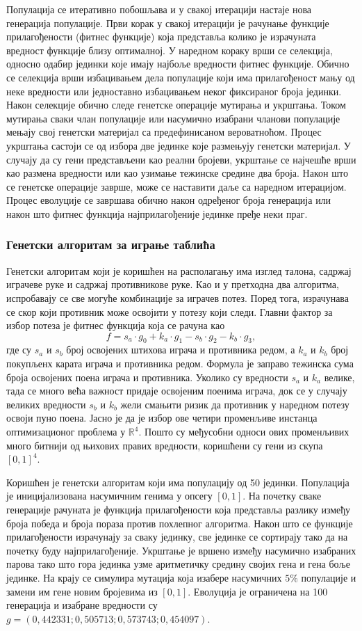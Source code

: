 \documentclass[a4paper, 12pt, ngerman]{article}
\begin{document}
Популација се итеративно побошљава и у свакој итерацији настаје нова генерација популације. Први корак у свакој итерацији је рачунање функције прилагођености (фитнес функције) која представља колико је израчуната вредност функције близу оптималној. У наредном кораку врши се селекција, односно одабир јединки које имају најбоље вредности фитнес функције. Обично се селекција врши избацивањем дела популације који има прилагођеност мању од неке вредности или једноставно избацивањем неког фиксираног броја јединки.  Након селекције обично следе генетске операције мутирања и укрштања. Током мутирања сваки члан популације или насумично изабрани чланови популације мењају свој генетски материјал са предефинисаном вероватноћом. Процес укрштања састоји се од избора две јединке које размењују генетски материјал. У случају да су гени представљени као реални бројеви, укрштање се најчешће врши као размена вредности или као узимање тежинске средине два броја. Након што се генетске операције заврше, може се наставити даље са наредном итерацијом. Процес еволуције се завршава обично након одређеног броја генерација или након што фитнес функција најприлагођеније јединке пређе неки праг.

\subsubsection{Генетски алгоритам за играње таблића}
Генетски алгоритам који је коришћен на располагању има изглед талона, садржај играчеве руке и садржај противникове руке. Као и у претходна два алгоритма, испробавају се све могуће комбинације за играчев потез. Поред тога, израчунава се скор који противник може освојити у потезу који следи. Главни фактор за избор потеза је фитнес функција која се рачуна као
$$f = s_a \cdot g_0 + k_a \cdot g_1 - s_b \cdot g_2 - k_b \cdot g_3,$$
где су $s_a$ и $s_b$ број освојених штихова играча и противника редом, а $k_a$ и $k_b$ број покупљенх карата играча и противника редом. Формула је заправо тежинска сума броја освојених поена играча и противника. Уколико су вредности $s_a$ и $k_a$ велике, тада се много већа важност придаје освојеним поенима играча, док се у случају великих вредности $s_b$ и $k_b$ жели смањити ризик да противник у наредном потезу освоји пуно поена. Јасно је да је избор ове четири променљиве инстанца оптимизационог проблема у $\mathbb{R}^4$. Пошто су међусобни односи ових променљивих много битнији од њихових правих вредности, коришћени су гени из скупа $[0, 1]^4$.

Коришћен је генетски алгоритам који има популацију од 50 јединки. Популација је иницијализована насумичним генима у опсегу $[0, 1]$. На почетку сваке генерације рачуната је функција прилагођености која представља разлику између броја победа и броја пораза против похлепног алгоритма. Након што се функције прилагођености израчунају за сваку јединку, све јединке се сортирају тако да на почетку буду најприлагођеније. Укрштање је вршено између насумично изабраних парова тако што гора јединка узме аритметичку средину својих гена и гена боље јединке. На крају се симулира мутација која изабере насумичних $5\%$ популације и замени им гене новим бројевима из $[0, 1]$. Еволуција је ограничена на 100 генерација и изабране вредности су $g = (0,442331; 0,505713; 0,573743; 0,454097)$. 
\end{document}
